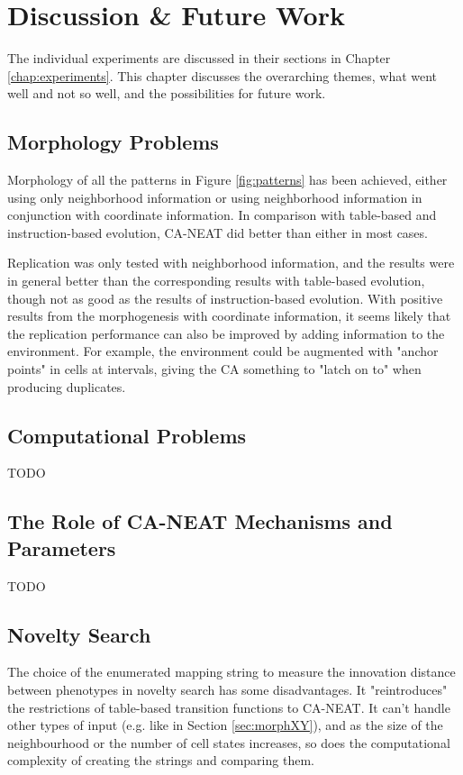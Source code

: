 \chapter{Discussion \& Future Work}
The individual experiments are discussed in their sections in Chapter \ref{chap:experiments}.
This chapter discusses the overarching themes, what went well and not so well, and the possibilities for future work.

\section{Morphology Problems}
Morphology of all the patterns in Figure \ref{fig:patterns} has been achieved,
either using only neighborhood information or using neighborhood information in conjunction with coordinate information.
In comparison with table-based and instruction-based evolution, CA-NEAT did better than either in most cases.

Replication was only tested with neighborhood information,
and the results were in general better than the corresponding results with table-based evolution,
though not as good as the results of instruction-based evolution.
With positive results from the morphogenesis with coordinate information,
it seems likely that the replication performance can also be improved by adding information to the environment.
For example, the environment could be augmented with "anchor points" in cells at intervals, giving the CA something to "latch on to" when producing duplicates.

\section{Computational Problems}
TODO

\section{The Role of CA-NEAT Mechanisms and Parameters}
TODO

\section{Novelty Search}
The choice of the enumerated mapping string to measure the innovation distance between phenotypes in novelty search has some disadvantages.
It "reintroduces" the restrictions of table-based transition functions to CA-NEAT.
It can't handle other types of input (e.g. like in Section \ref{sec:morphXY}),
and as the size of the neighbourhood or the number of cell states increases, so does the computational complexity of creating the strings and comparing them.

